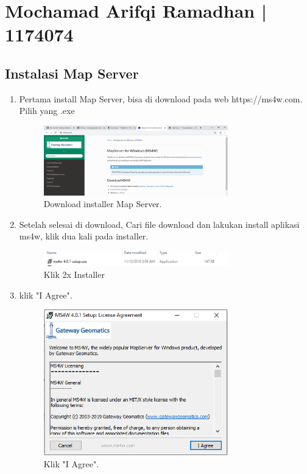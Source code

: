\section{Mochamad Arifqi Ramadhan | 1174074}
\subsection{Instalasi Map Server}
\begin{enumerate}
	\item  Pertama install Map Server, bisa di download pada web https://ms4w.com. Pilih yang .exe
	\hfill\break
	\begin{figure}[H]
		\includegraphics[width=8cm]{figures/Tugas4/1174074/1.png}
		\centering
		\caption{Download installer Map Server.}
	\end{figure}
	\item  Setelah selesai di download, Cari file download dan lakukan install aplikasi ms4w, klik dua kali pada installer.
	\hfill\break
	\begin{figure}[H]
		\includegraphics[width=8cm]{figures/Tugas4/1174074/2.png}
		\centering
		\caption{Klik 2x Installer}
	\end{figure}
	\item  klik "I Agree".
	\hfill\break
	\begin{figure}[H]
		\includegraphics[width=8cm]{figures/Tugas4/1174074/3.png}
		\centering
		\caption{Klik "I Agree".}
	\end{figure}

\end{enumerate}
